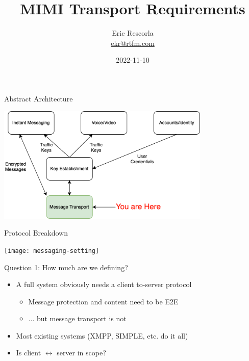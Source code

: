 \documentclass[helvetica]{beamer}
\title{MIMI Transport Requirements}
\author{Eric Rescorla \\\url{ekr@rtfm.com}}
\date{2022-11-10}
\begin{document}
\begin{frame}
  \titlepage
\end{frame}

\begin{frame}{Abstract Architecture}

  \vspace{.2in}
\begin{center}
  \includegraphics[width=4in]{messaging-architecture}
\end{center}
\end{frame}


\begin{frame}{Protocol Breakdown}

  \vspace{.2in}
\begin{center}
  \texttt{[image: messaging-setting]}
\end{center}
\end{frame}

\begin{frame}{Question 1: How much are we defining?}

  \begin{itemize}
  \item A full system obviously needs a client to-server protocol
    \begin{itemize}
    \item Message protection and content need to be E2E
    \item ... but message transport is not      
    \end{itemize}
  \item Most existing systems (XMPP, SIMPLE, etc. do it all)
  \item Is client $\longleftrightarrow$ server in scope?
  \end{itemize}  
\end{frame}
\end{document}
